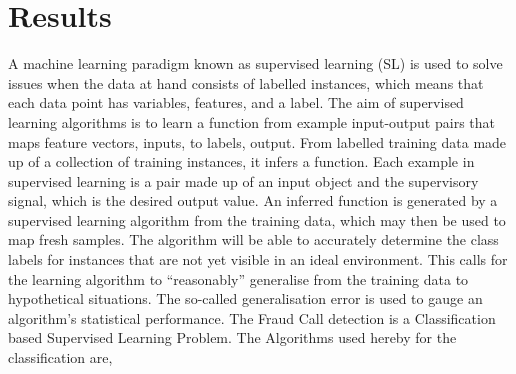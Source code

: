 \documentclass[sn-basic]{sn-jnl}%
\theoremstyle{thmstyleone}%
\theoremstyle{thmstyletwo}%
\theoremstyle{thmstylethree}%
\begin{document}
\section{Results}
A machine learning paradigm known as supervised learning (SL) is used to solve issues when the data at hand consists of labelled instances, which means that each data point has variables, features, and a label. The aim of supervised learning algorithms is to learn a function from example input-output pairs that maps feature vectors, inputs, to labels, output. From labelled training data made up of a collection of training instances, it infers a function. Each example in supervised learning is a pair made up of an input object and the supervisory signal, which is the desired output value. An inferred function is generated by a supervised learning algorithm from the training data, which may then be used to map fresh samples. The algorithm will be able to accurately determine the class labels for instances that are not yet visible in an ideal environment. This calls for the learning algorithm to “reasonably” generalise from the training data to hypothetical situations. The so-called generalisation error is used to gauge an algorithm's statistical performance. The Fraud Call detection is a Classification based Supervised Learning Problem. The Algorithms used hereby for the classification are, 
\end{document}
